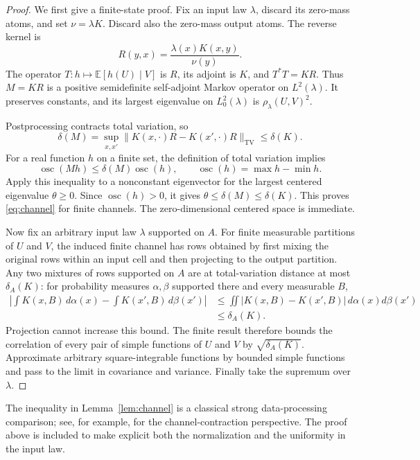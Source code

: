 \documentclass[11pt]{amsart}
\numberwithin{equation}{section}
\theoremstyle{definition}
\newcommand{\EE}{\mathbb E}
\newcommand{\TV}{\mathrm{TV}}
\newcommand{\osc}{\operatorname{osc}}
\begin{document}
\begin{proof}
We first give a finite-state proof. Fix an input law $\lambda$, discard its zero-mass atoms, and set $\nu=\lambda K$. Discard also the zero-mass output atoms. The reverse kernel is
\[
R(y,x)=\frac{\lambda(x)K(x,y)}{\nu(y)}.
\]
The operator $T:h\mapsto\EE[h(U)\mid V]$ is $R$, its adjoint is $K$, and $T^*T=KR$. Thus $M=KR$ is a positive semidefinite self-adjoint Markov operator on $L^2(\lambda)$. It preserves constants, and its largest eigenvalue on $L^2_0(\lambda)$ is $\rho_\lambda(U,V)^2$.

Postprocessing contracts total variation, so
\[
\delta(M)=\sup_{x,x'}\|K(x,\cdot)R-K(x',\cdot)R\|_{\TV}
\le\delta(K).
\]
For a real function $h$ on a finite set, the definition of total variation implies
\[
\osc(Mh)\le\delta(M)\osc(h),\qquad
\osc(h)=\max h-\min h.
\]
Apply this inequality to a nonconstant eigenvector for the largest centered eigenvalue $\theta\ge0$. Since $\osc(h)>0$, it gives $\theta\le\delta(M)\le\delta(K)$. This proves \eqref{eq:channel} for finite channels. The zero-dimensional centered space is immediate.

Now fix an arbitrary input law $\lambda$ supported on $A$. For finite measurable partitions of $U$ and $V$, the induced finite channel has rows obtained by first mixing the original rows within an input cell and then projecting to the output partition. Any two mixtures of rows supported on $A$ are at total-variation distance at most $\delta_A(K)$: for probability measures $\alpha,\beta$ supported there and every measurable $B$,
\begin{align*}
\left|\int K(x,B)\,d\alpha(x)-\int K(x',B)\,d\beta(x')\right|
&\le\iint|K(x,B)-K(x',B)|\,d\alpha(x)d\beta(x')\\
&\le\delta_A(K).
\end{align*}
Projection cannot increase this bound. The finite result therefore bounds the correlation of every pair of simple functions of $U$ and $V$ by $\sqrt{\delta_A(K)}$. Approximate arbitrary square-integrable functions by bounded simple functions and pass to the limit in covariance and variance. Finally take the supremum over $\lambda$.
\end{proof}

The inequality in Lemma~\ref{lem:channel} is a classical strong data-processing comparison; see, for example, \cite{PolyanskiyWu2016} for the channel-contraction perspective. The proof above is included to make explicit both the normalization and the uniformity in the input law.
\end{document}
